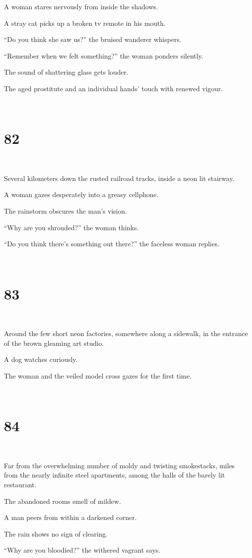 \documentclass{report}
\begin{document}
A woman stares nervously from inside the shadows.

A stray cat picks up a broken tv remote in his mouth.

``Do you think she saw us?'' the bruised wanderer whispers.

``Remember when we felt something?'' the woman ponders silently.

The sound of shattering glass gets louder.

The aged prostitute and an individual hands' touch with renewed vigour.

~
\chapter*{82}
~

Several kilometers down the rusted railroad tracks, inside a neon lit stairway.

A woman gazes desperately into a greasy cellphone.

The rainstorm obscures the man's vision.

``Why are you shrouded?'' the woman thinks.

``Do you think there's something out there?'' the faceless woman replies.

~
\chapter*{83}
~

Around the few short neon factories, somewhere along a sidewalk, in the entrance of the brown gleaming art studio.

A dog watches curiously.

The woman and the veiled model cross gazes for the first time.

~
\chapter*{84}
~

Far from the overwhelming number of moldy and twisting smokestacks, miles from the nearly infinite steel apartments, among the halls of the barely lit restaurant.

The abandoned rooms smell of mildew.

A man peers from within a darkened corner.

The rain shows no sign of clearing.

``Why are you bloodied?'' the withered vagrant says.
\end{document}
